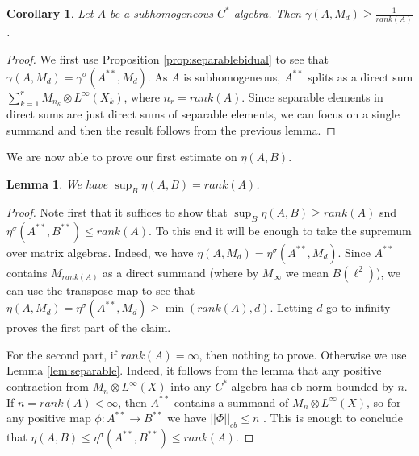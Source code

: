 \documentclass[11pt]{article}
\numberwithin{theorem}{section}
\newtheorem{lemma}[theorem]{Lemma}
\newtheorem{corollary}[theorem]{Corollary}
\begin{document}
\begin{corollary}
Let $A$ be a subhomogeneous $C^{\ast}$-algebra. Then $\gamma(A, M_{d}) \geqslant \frac{1}{rank(A)}$.
\end{corollary}
\begin{proof}
We first use Proposition \ref{prop:separablebidual} to see that $\gamma(A, M_d) = \gamma^{\sigma}(A^{\ast\ast}, M_d)$. As $A$ is subhomogeneous, $A^{\ast\ast}$ splits as a direct sum $\sum_{k=1}^{r} M_{n_{k}} \otimes L^{\infty}(X_k)$, where $n_{r} = rank(A)$. Since separable elements in direct sums are just direct sums of separable elements, we can focus on a single summand and then the result follows from the previous lemma.
\end{proof}


We are now able to prove our first estimate on $\eta(A,B)$.
\begin{lemma}
We have $\sup_{B} \eta(A,B) = rank(A)$.
\end{lemma}
\begin{proof}
Note first that it suffices to show that $\sup_{B} \eta(A,B) \geqslant rank(A)$ snd $\eta^{\sigma}(A^{\ast\ast}, B^{\ast\ast}) \leqslant rank(A)$. To this end it will be enough to take the supremum over matrix algebras. Indeed, we have $\eta(A, M_d) = \eta^{\sigma}(A^{\ast\ast}, M_d)$. Since $A^{\ast\ast}$ contains $M_{rank(A)}$ as a direct summand (where by $M_{\infty}$ we mean $B(\ell^2)$), we can use the transpose map to see that $\eta(A, M_d) = \eta^{\sigma}(A^{\ast\ast}, M_d) \geqslant \min(rank(A), d)$. Letting $d$ go to infinity proves the first part of the claim.

For the second part, if $rank(A)=\infty$, then nothing to prove. Otherwise we use Lemma \ref{lem:separable}. Indeed, it follows from the lemma that any positive contraction from $  M_n \otimes L^{\infty}(X)$ into any $C^{\ast}$-algebra has cb norm bounded by $n$. If $n=rank(A)<\infty$, then  $A^{\ast\ast}$ contains a summand of $M_n \otimes L^{\infty}(X)$, so for any positive map $\phi: A^{\ast\ast} \to B^{\ast\ast}$ we have $||\Phi||_{cb}\leq n$ . This is enough to conclude that $\eta(A,B) \leqslant \eta^{\sigma}(A^{\ast\ast},B^{\ast\ast})\leqslant rank(A)$.
\end{proof}
\end{document}
